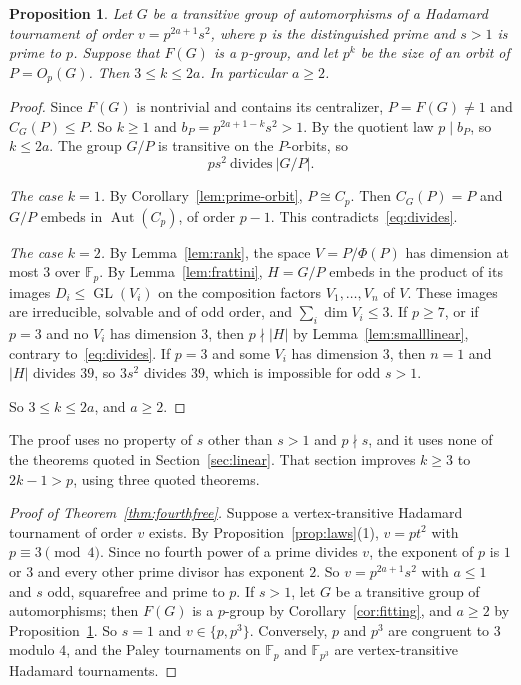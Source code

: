 \documentclass[11pt]{amsart}
\newtheorem{proposition}[theorem]{Proposition}
\theoremstyle{definition}
\theoremstyle{remark}
\newcommand{\F}{\mathbb{F}}
\newcommand{\Aut}{\operatorname{Aut}}
\newcommand{\GL}{\operatorname{GL}}
\begin{document}
\begin{proposition}\label{prop:endgame}
Let $G$ be a transitive group of automorphisms of a Hadamard tournament of order $v=p^{2a+1}s^2$, where $p$ is the distinguished prime and $s>1$ is prime to $p$. Suppose that $F(G)$ is a $p$-group, and let $p^k$ be the size of an orbit of $P=O_p(G)$. Then $3\le k\le2a$. In particular $a\ge2$.
\end{proposition}
\begin{proof}
Since $F(G)$ is nontrivial and contains its centralizer, $P=F(G)\ne1$ and $C_G(P)\le P$. So $k\ge1$ and $b_P=p^{2a+1-k}s^2>1$. By the quotient law $p\mid b_P$, so $k\le2a$. The group $G/P$ is transitive on the $P$-orbits, so
\begin{equation}\label{eq:divides}
ps^2\ \text{divides}\ |G/P| .
\end{equation}

\emph{The case $k=1$.} By Corollary~\ref{lem:prime-orbit}, $P\cong C_p$. Then $C_G(P)=P$ and $G/P$ embeds in $\Aut(C_p)$, of order $p-1$. This contradicts~\eqref{eq:divides}.

\emph{The case $k=2$.} By Lemma~\ref{lem:rank}, the space $V=P/\Phi(P)$ has dimension at most $3$ over $\F_p$. By Lemma~\ref{lem:frattini}, $H=G/P$ embeds in the product of its images $D_i\le\GL(V_i)$ on the composition factors $V_1,\dots,V_n$ of $V$. These images are irreducible, solvable and of odd order, and $\sum_i\dim V_i\le3$. If $p\ge7$, or if $p=3$ and no $V_i$ has dimension $3$, then $p\nmid|H|$ by Lemma~\ref{lem:smalllinear}, contrary to~\eqref{eq:divides}. If $p=3$ and some $V_i$ has dimension $3$, then $n=1$ and $|H|$ divides $39$, so $3s^2$ divides $39$, which is impossible for odd $s>1$.

So $3\le k\le2a$, and $a\ge2$.
\end{proof}

The proof uses no property of $s$ other than $s>1$ and $p\nmid s$, and it uses none of the theorems quoted in Section~\ref{sec:linear}. That section improves $k\ge3$ to $2k-1>p$, using three quoted theorems.

\begin{proof}[Proof of Theorem~\ref{thm:fourthfree}]
Suppose a vertex-transitive Hadamard tournament of order $v$ exists. By Proposition~\ref{prop:laws}(1), $v=pt^2$ with $p\equiv3\pmod4$. Since no fourth power of a prime divides $v$, the exponent of $p$ is $1$ or $3$ and every other prime divisor has exponent $2$. So $v=p^{2a+1}s^2$ with $a\le1$ and $s$ odd, squarefree and prime to $p$. If $s>1$, let $G$ be a transitive group of automorphisms; then $F(G)$ is a $p$-group by Corollary~\ref{cor:fitting}, and $a\ge2$ by Proposition~\ref{prop:endgame}. So $s=1$ and $v\in\{p,p^3\}$. Conversely, $p$ and $p^3$ are congruent to $3$ modulo $4$, and the Paley tournaments on $\F_p$ and $\F_{p^3}$ are vertex-transitive Hadamard tournaments.
\end{proof}
\end{document}
